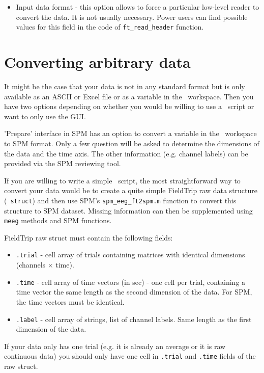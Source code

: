 \begin{itemize}
\item Input data format - this option allows to force a particular low-level reader to convert the data. It is not usually necessary. Power users can find possible values for this field in the code of \texttt{ft\_read\_header} function. 
\end{itemize}


\section{Converting arbitrary data}
It might be the case that your data is not in any standard format but is only available as an ASCII or Excel file or as a variable in the \matlab\ workspace. Then you have two options depending on whether you would be willing to use a \matlab\ script or want to only use the GUI. 

'Prepare' interface in SPM has an option to convert a variable in the \matlab\ workspace to SPM format. Only a few question will be asked to determine the dimensions of the data and the time axis. The other information (e.g. channel labels) can be provided via the SPM reviewing tool. 

If you are willing to write a simple \matlab\ script, the most straightforward way to convert your data would be to create a quite simple FieldTrip raw data structure (\matlab\ \texttt{struct}) and then use SPM's \texttt{spm\_eeg\_ft2spm.m} function to convert this structure to SPM dataset. Missing information can then be supplemented using \texttt{meeg} methods and SPM functions.

FieldTrip raw struct must contain the following fields:

\begin{itemize}
\item \texttt{.trial} - cell array of trials containing matrices with identical dimensions (channels $\times$ time). 
\item \texttt{.time} - cell array of time vectors (in sec) - one cell per trial, containing a time vector the same length as the second dimension of the data. For SPM, the time vectors must be identical.
\item \texttt{.label} - cell array of strings, list of channel labels. Same length as the first dimension of the data.
\end{itemize}

If your data only has one trial (e.g. it is already an average or it is raw continuous data) you should only have one cell in \texttt{.trial} and \texttt{.time} fields of the raw struct.

